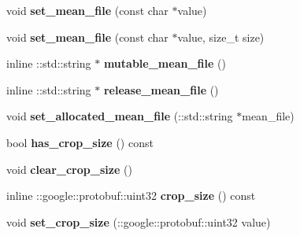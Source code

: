 \begin{DoxyCompactItemize}
\item 
\mbox{\label{classcaffe_1_1_data_parameter_adebde689fc2a0fddd3dfac1995365b71}} 
void {\bfseries set\+\_\+mean\+\_\+file} (const char $\ast$value)
\item 
\mbox{\label{classcaffe_1_1_data_parameter_a5d91661943787841d3d691f98229cd16}} 
void {\bfseries set\+\_\+mean\+\_\+file} (const char $\ast$value, size\+\_\+t size)
\item 
\mbox{\label{classcaffe_1_1_data_parameter_a395af92c844cabb614b5f912dac5d505}} 
inline \+::std\+::string $\ast$ {\bfseries mutable\+\_\+mean\+\_\+file} ()
\item 
\mbox{\label{classcaffe_1_1_data_parameter_ab70cbed3910fe928072e333d5b2f7a5f}} 
inline \+::std\+::string $\ast$ {\bfseries release\+\_\+mean\+\_\+file} ()
\item 
\mbox{\label{classcaffe_1_1_data_parameter_a8b0ecf33d64fbc4cdc15e9e50130f12b}} 
void {\bfseries set\+\_\+allocated\+\_\+mean\+\_\+file} (\+::std\+::string $\ast$mean\+\_\+file)
\item 
\mbox{\label{classcaffe_1_1_data_parameter_a46851ba97c6cb330343c84def63f0957}} 
bool {\bfseries has\+\_\+crop\+\_\+size} () const
\item 
\mbox{\label{classcaffe_1_1_data_parameter_a611d8c462098d62ca5a299a748e626f7}} 
void {\bfseries clear\+\_\+crop\+\_\+size} ()
\item 
\mbox{\label{classcaffe_1_1_data_parameter_a0e28cec521b356a1f152b01025030e98}} 
inline \+::google\+::protobuf\+::uint32 {\bfseries crop\+\_\+size} () const
\item 
\mbox{\label{classcaffe_1_1_data_parameter_ae4f596ba14be30274eaf8fcd532e5c01}} 
void {\bfseries set\+\_\+crop\+\_\+size} (\+::google\+::protobuf\+::uint32 value)
\item 
\mbox{\label{classcaffe_1_1_data_parameter_acac4adfc9b27131eac6ce160bbde1545}} 

\end{DoxyCompactItemize}

